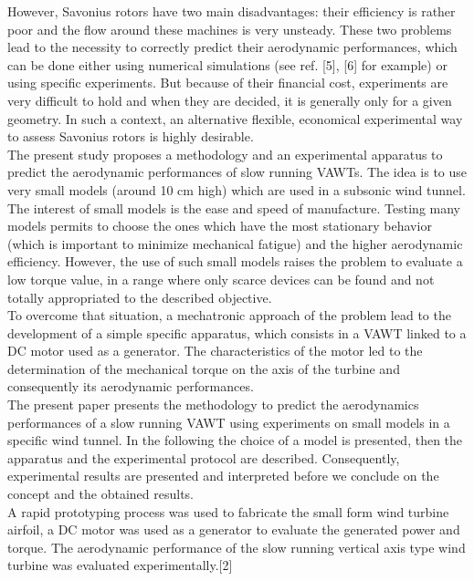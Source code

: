 \documentclass[a4paper,12pt]{article}
\begin{document}
However, Savonius rotors have two main disadvantages: their efficiency is rather poor and the flow around these machines is very unsteady. These two problems lead to the necessity to correctly predict their aerodynamic performances, which can be done either using numerical simulations (see ref. [5], [6] for example) or using specific experiments. But because of their financial cost, experiments are very difficult to hold and when they are decided, it is generally only for a given geometry. In such a context, an alternative flexible, economical experimental way to assess Savonius rotors is highly desirable.\\

The present study proposes a methodology and an experimental apparatus to predict the aerodynamic performances of slow running VAWTs. The idea is to use very small models (around 10 cm high) which are used in a subsonic wind tunnel. The interest of small models is the ease and speed of manufacture. Testing many models permits to choose the ones which have the most stationary behavior (which is important to minimize mechanical fatigue) and the higher aerodynamic efficiency. However, the use of such small models raises the problem to evaluate a low torque value, in a range where only scarce devices can be found and not totally appropriated to the described objective.\\

To overcome that situation, a mechatronic approach of the problem lead to the development of a simple specific apparatus, which consists in a VAWT linked to a DC motor used as a generator. The characteristics of the motor led to the determination of the mechanical torque on the axis of the turbine and consequently its aerodynamic performances.\\

The present paper presents the methodology to predict the aerodynamics performances of a slow running VAWT using experiments on small models in a specific wind tunnel. In the following the choice of a model is presented, then the apparatus and the experimental protocol are described. Consequently, experimental results are presented and interpreted before we conclude on the concept and the obtained results.\\

A rapid prototyping process was used to fabricate
the small form wind turbine airfoil, a DC motor
was used as a generator to evaluate the generated
power and torque. The aerodynamic performance
of the slow running vertical axis type wind
turbine was evaluated experimentally.[2]\\
\end{document}
